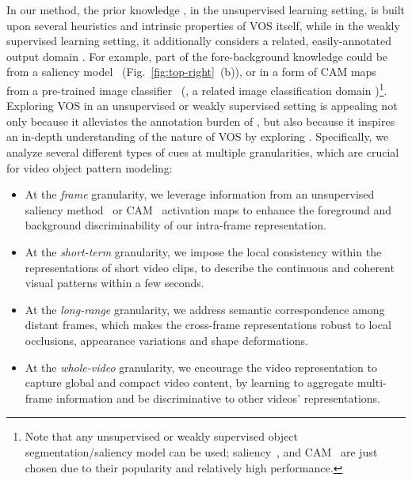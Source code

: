 \documentclass[10pt,twocolumn,letterpaper]{article}
\begin{document}
In our method, the prior knowledge \bm{}, in the unsupervised learning setting, is built upon several heuristics and intrinsic properties of VOS itself, while in the weakly supervised learning setting, it additionally considers a related, easily-annotated output domain \bm{}. For example, part of the fore-background knowledge could be from a saliency model~\!\cite{DBLP:conf/cvpr/YangZLRY13} (Fig.~\!\ref{fig:top-right}~\!(b)), or in a form of CAM maps~\!\cite{zeng2019multi,zhou2016learning} from a pre-trained image classifier~\!\cite{Huang_2017_CVPR} (\ie, a related image classification domain \bm{})\footnote{\scriptsize{Note that any unsupervised or weakly supervised object segmentation/saliency model can be used; saliency~\!\cite{DBLP:conf/cvpr/YangZLRY13}, and CAM~\!\cite{zeng2019multi,zhou2016learning} are just chosen due to their popularity and relatively high performance.}}. Exploring VOS in an unsupervised or weakly supervised
setting is appealing not only because it  alleviates the annotation burden of
\bm{}, but also because it inspires  an in-depth
understanding of the nature of VOS by exploring
\bm{}. Specifically, we analyze several different types of cues at multiple granularities, which are crucial for video object pattern modeling:
\vspace*{-0pt}
\begin{itemize}[leftmargin=*]
	\setlength{\itemsep}{0pt}
	\setlength{\parsep}{-2pt}
	\setlength{\parskip}{-0pt}
	\setlength{\leftmargin}{-13pt}
	\vspace{-5pt}
	\item At the \textit{frame} granularity, we leverage information from an unsupervised saliency method~\!\cite{DBLP:conf/cvpr/YangZLRY13} or CAM~\!\cite{zeng2019multi,zhou2016learning} activation maps to enhance the foreground and background discriminability of our intra-frame representation.
	\item At the \textit{short-term} granularity, we impose the local consistency within the representations of short video clips, to describe the continuous and coherent visual patterns within a few seconds.
	\item At the \textit{long-range} granularity, we address semantic correspondence among distant frames, which makes the cross-frame representations robust to local occlusions, appearance variations and shape deformations.
	\item At the \textit{whole-video} granularity, we encourage the video representation to capture global and compact video content, by learning to aggregate multi-frame information and be discriminative to other videos' representations.
	\vspace*{-2pt}
\end{itemize}
\end{document}
